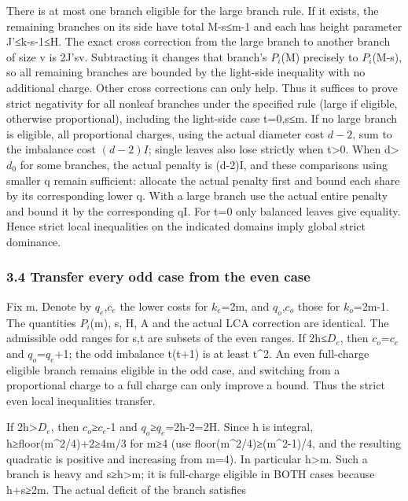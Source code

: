 \documentclass[
  10pt,
  a4paper,
]{article}
\begin{document}
There is at most one branch eligible for the large branch rule. If it
exists, the remaining branches on its side have total M-s≤m-1 and each
has height parameter J'≤k-s-1≤H. The exact cross correction from the
large branch to another branch of size v is 2J'sv. Subtracting it
changes that branch's \(P_i\)(M) precisely to \(P_i\)(M-s), so all
remaining branches are bounded by the light-side inequality with no
additional charge. Other cross corrections can only help. Thus it
suffices to prove strict negativity for all nonleaf branches under the
specified rule (large if eligible, otherwise proportional), including
the light-side case t=0,s≤m. If no large branch is eligible, all
proportional charges, using the actual diameter cost \(d-2\), sum to the
imbalance cost \((d-2)I\); single leaves also lose strictly when
t\textgreater0. When d\textgreater{}\(d_0\) for some branches, the
actual penalty is (d-2)I, and these comparisons using smaller q remain
sufficient: allocate the actual penalty first and bound each share by
its corresponding lower q. With a large branch use the actual entire
penalty and bound it by the corresponding qI. For t=0 only balanced
leaves give equality. Hence strict local inequalities on the indicated
domains imply global strict dominance.

\subsubsection{3.4 Transfer every odd case from the even
case}\label{transfer-every-odd-case-from-the-even-case}

Fix m. Denote by \(q_e\),\(c_e\) the lower costs for \(k_e\)=2m, and
\(q_o\),\(c_o\) those for \(k_o\)=2m-1. The quantities \(P_i\)(m), s, H,
A and the actual LCA correction are identical. The admissible odd ranges
for s,t are subsets of the even ranges. If 2h≤\(D_e\), then
\(c_o\)=\(c_e\) and \(q_o\)=\(q_e\)+1; the odd imbalance t(t+1) is at
least t\^{}2. An even full-charge eligible branch remains eligible in
the odd case, and switching from a proportional charge to a full charge
can only improve a bound. Thus the strict even local inequalities
transfer.

If 2h\textgreater{}\(D_e\), then \(c_o\)≥\(c_e\)-1 and
\(q_o\)≥\(q_e\)=2h-2=2H. Since h is integral, h≥floor(m\^{}2/4)+2≥4m/3
for m≥4 (use floor(m\^{}2/4)≥(m\^{}2-1)/4, and the resulting quadratic
is positive and increasing from m=4). In particular h\textgreater m.
Such a branch is heavy and s≥h\textgreater m; it is full-charge eligible
in BOTH cases because h+s≥2m. The actual deficit of the branch satisfies
\end{document}

